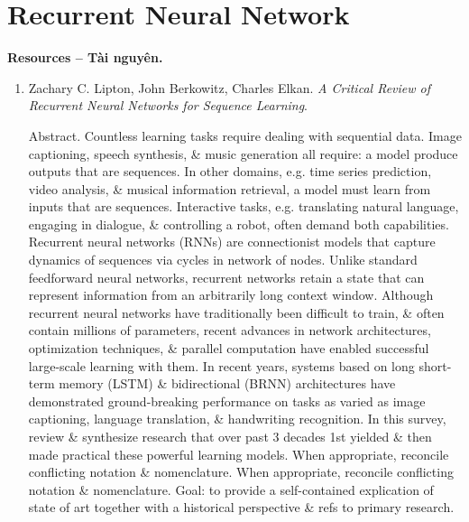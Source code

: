 \documentclass{article}
\begin{document}

\section{Recurrent Neural Network}
\textbf{\textsf{Resources -- Tài nguyên.}}
\begin{enumerate}
	\item {\sc Zachary C. Lipton, John Berkowitz, Charles Elkan}. {\it A Critical Review of Recurrent Neural Networks for Sequence Learning}. {\sf[3525 citations]}
	
	{\sf Abstract.} Countless learning tasks require dealing with sequential data. Image captioning, speech synthesis, \& music generation all require: a model produce outputs that are sequences. In other domains, e.g. time series prediction, video analysis, \& musical information retrieval, a model must learn from inputs that are sequences. Interactive tasks, e.g. translating natural language, engaging in dialogue, \& controlling a robot, often demand both capabilities. Recurrent neural networks (RNNs) are connectionist models that capture dynamics of sequences via cycles in network of nodes. Unlike standard feedforward neural networks, recurrent networks retain a state that can represent information from an arbitrarily long context window. Although recurrent neural networks have traditionally been difficult to train, \& often contain millions of parameters, recent advances in network architectures, optimization techniques, \& parallel computation have enabled successful large-scale learning with them. In recent years, systems based on long short-term memory (LSTM) \& bidirectional (BRNN) architectures have demonstrated ground-breaking performance on tasks as varied as image captioning, language translation, \& handwriting recognition. In this survey, review \& synthesize research that over past 3 decades 1st yielded \& then made practical these powerful learning models. When appropriate, reconcile conflicting notation \& nomenclature. When appropriate, reconcile conflicting notation \& nomenclature. Goal: to provide a self-contained explication of state of art together with a historical perspective \& refs to primary research.
	\begin{itemize}

\end{itemize}
\end{enumerate}
\end{document}
